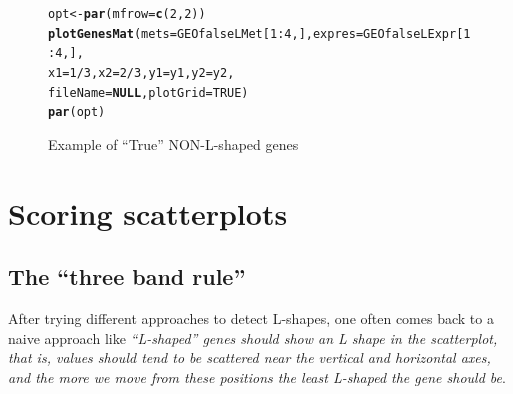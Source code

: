 \documentclass[a4paper,10pt]{article}\usepackage[]{graphicx}\usepackage[]{color}
\makeatletter
\newcommand{\hlnum}[1]{\textcolor[rgb]{0.686,0.059,0.569}{#1}}%
\newcommand{\hlopt}[1]{\textcolor[rgb]{0,0,0}{#1}}%
\newcommand{\hlstd}[1]{\textcolor[rgb]{0.345,0.345,0.345}{#1}}%
\newcommand{\hlkwa}[1]{\textcolor[rgb]{0.161,0.373,0.58}{\textbf{#1}}}%
\newcommand{\hlkwb}[1]{\textcolor[rgb]{0.69,0.353,0.396}{#1}}%
\newcommand{\hlkwc}[1]{\textcolor[rgb]{0.333,0.667,0.333}{#1}}%
\newcommand{\hlkwd}[1]{\textcolor[rgb]{0.737,0.353,0.396}{\textbf{#1}}}%
\newenvironment{kframe}{%
 \def\at@end@of@kframe{}%
 \ifinner\ifhmode%
  \def\at@end@of@kframe{\end{minipage}}%
  \begin{minipage}{\columnwidth}%
 \fi\fi%
 \def\FrameCommand##1{\hskip\@totalleftmargin \hskip-\fboxsep
 \colorbox{shadecolor}{##1}\hskip-\fboxsep
     \hskip-\linewidth \hskip-\@totalleftmargin \hskip\columnwidth}%
 \MakeFramed {\advance\hsize-\width
   \@totalleftmargin\z@ \linewidth\hsize
   \@setminipage}}%
 {\par\unskip\endMakeFramed%
 \at@end@of@kframe}
\newenvironment{knitrout}{}{} %
\makeatother
\begin{document}
\begin{figure}
\centering
\begin{knitrout}
\color{fgcolor}\begin{kframe}
\begin{alltt}
\hlstd{opt}\hlkwb{<-} \hlkwd{par}\hlstd{(}\hlkwc{mfrow}\hlstd{=}\hlkwd{c}\hlstd{(}\hlnum{2}\hlstd{,}\hlnum{2}\hlstd{))}
\hlkwd{plotGenesMat} \hlstd{(}\hlkwc{mets}\hlstd{=GEOfalseLMet[}\hlnum{1}\hlopt{:}\hlnum{4}\hlstd{,],} \hlkwc{expres}\hlstd{=GEOfalseLExpr[}\hlnum{1}\hlopt{:}\hlnum{4}\hlstd{,],}
              \hlkwc{x1}\hlstd{=}\hlnum{1}\hlopt{/}\hlnum{3}\hlstd{,} \hlkwc{x2}\hlstd{=}\hlnum{2}\hlopt{/}\hlnum{3}\hlstd{,} \hlkwc{y1}\hlstd{=y1,} \hlkwc{y2}\hlstd{=y2,}
               \hlkwc{fileName}\hlstd{=}\hlkwa{NULL}\hlstd{,} \hlkwc{plotGrid} \hlstd{=} \hlnum{TRUE}\hlstd{)}
\hlkwd{par}\hlstd{(opt)}
\end{alltt}
\end{kframe}
\end{knitrout}
\caption{Example of ``True'' NON-L-shaped genes\label{Lshaped2}}
\end{figure}


\section{Scoring scatterplots}

\subsection{The ``three band rule''}

After trying different approaches to detect L-shapes, one often comes back to a naive approach like \emph{``L-shaped'' genes should show an L shape in the scatterplot, that is, values should tend to be scattered near the vertical and horizontal axes, and the more we move from these positions the least L-shaped the gene should be}.
\end{document}

